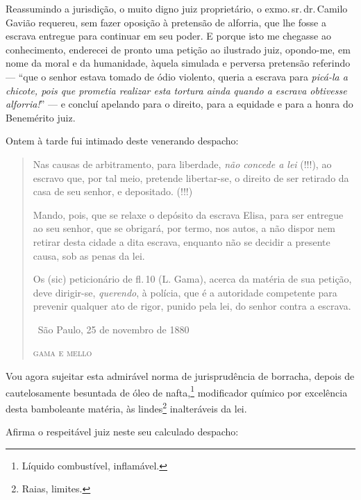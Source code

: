 Reassumindo a jurisdição, o muito digno juiz proprietário, o exmo.\,sr.\,dr.\,Camilo Gavião requereu, sem fazer oposição à pretensão de alforria,
que lhe fosse a escrava entregue para continuar em seu poder. E porque
isto me chegasse ao conhecimento, enderecei de pronto uma petição ao
ilustrado juiz, opondo-me, em nome da moral e da humanidade, àquela
simulada e perversa pretensão referindo --- ``que o senhor estava
tomado de ódio violento, queria a escrava para \emph{picá-la a chicote,
pois que prometia realizar esta tortura ainda quando a escrava obtivesse
alforria!}'' --- e concluí apelando para o direito, para a equidade
e para a honra do Benemérito juiz.

Ontem à tarde fui intimado deste venerando despacho:

\begin{quote}
Nas causas de arbitramento, para liberdade, \emph{não concede a lei}
(!!!), ao escravo que, por tal meio, pretende libertar-se, o direito de
ser retirado da casa de seu senhor, e depositado. (!!!)

Mando, pois, que se relaxe o depósito da escrava Elisa, para ser
entregue ao seu senhor, que se obrigará, por termo, nos autos, a não
dispor nem retirar desta cidade a dita escrava, enquanto não se decidir
a presente causa, sob as penas da lei.

Os (sic) peticionário de fl.\,10 (L. Gama), acerca da matéria de sua
petição, deve dirigir-se, \emph{querendo}, à polícia, que é a autoridade
competente para prevenir qualquer ato de rigor, punido pela lei, do
senhor contra a escrava.

\medskip

\hfill\ São Paulo, 25 de novembro de 1880

\hfill\textsc{gama e mello}
\end{quote}

\asterisc

Vou agora sujeitar esta admirável norma de jurisprudência de borracha,
depois de cautelosamente besuntada de óleo de nafta,\footnote{Líquido
  combustível, inflamável.} modificador químico por excelência desta
bamboleante matéria, às lindes\footnote{Raias, limites.} inalteráveis
da lei.

Afirma o respeitável juiz neste seu calculado despacho:

